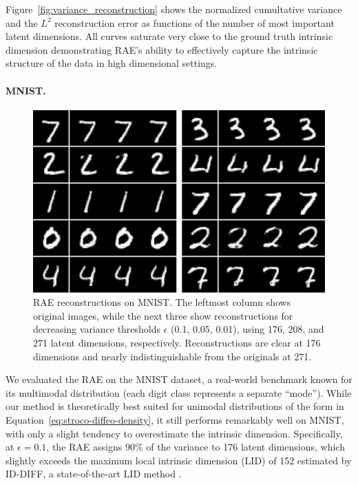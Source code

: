 Figure~\ref{fig:variance_reconstruction} shows the normalized cumultative variance and the \(L^2\) reconstruction error as functions of the number of most important latent dimensions. All curves saturate very close to the ground truth intrinsic dimension demonstrating RAE’s ability to effectively capture the intrinsic structure of the data in high dimensional settings.


\paragraph{MNIST.}

\begin{figure}[!htbp]
    \centering
    \includegraphics[width=\textwidth, height=0.33\textheight, keepaspectratio]{Chapter5/results/mnist/reconstruction.png}
        \caption{RAE reconstructions on MNIST. The leftmost column shows original images, while the next three show reconstructions for decreasing variance thresholds \(\epsilon\) (0.1, 0.05, 0.01), using 176, 208, and 271 latent dimensions, respectively. Reconstructions are clear at 176 dimensions and nearly indistinguishable from the originals at 271.}
    \label{fig:MNIST_reconstruction}
\end{figure}


We evaluated the RAE on the MNIST dataset, a real-world benchmark known for its multimodal distribution (each digit class represents a separate “mode”). While our method is theoretically best suited for unimodal distributions of the form in Equation~\ref{eq:stroco-diffeo-density}, it still performs remarkably well on MNIST, with only a slight tendency to overestimate the intrinsic dimension. Specifically, at \(\epsilon = 0.1\), the RAE assigns 90\% of the variance to 176 latent dimensions, which slightly exceeds the maximum local intrinsic dimension (LID) of 152 estimated by ID-DIFF, a state-of-the-art LID method \cite{pmlr-v235-stanczuk24a}.

